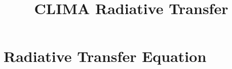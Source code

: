 \documentclass{report}
\title{CLIMA Radiative Transfer}
\author{ }
\begin{document}
\maketitle
\tableofcontents

\chapter{Radiative Transfer Equation}




\end{document}
